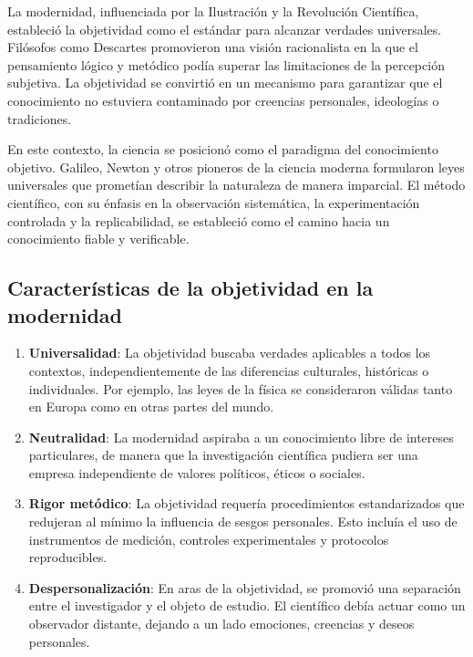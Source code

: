 \documentclass[
  letterpaper,
  DIV=11,
  numbers=noendperiod]{scrreprt}
\begin{document}
La modernidad, influenciada por la Ilustración y la Revolución
Científica, estableció la objetividad como el estándar para alcanzar
verdades universales. Filósofos como Descartes promovieron una visión
racionalista en la que el pensamiento lógico y metódico podía superar
las limitaciones de la percepción subjetiva. La objetividad se convirtió
en un mecanismo para garantizar que el conocimiento no estuviera
contaminado por creencias personales, ideologías o tradiciones.

En este contexto, la ciencia se posicionó como el paradigma del
conocimiento objetivo. Galileo, Newton y otros pioneros de la ciencia
moderna formularon leyes universales que prometían describir la
naturaleza de manera imparcial. El método científico, con su énfasis en
la observación sistemática, la experimentación controlada y la
replicabilidad, se estableció como el camino hacia un conocimiento
fiable y verificable.

\subsection{Características de la objetividad en la
modernidad}\label{caracteruxedsticas-de-la-objetividad-en-la-modernidad}

\begin{enumerate}
\def\labelenumi{\arabic{enumi}.}
\item
  \textbf{Universalidad}: La objetividad buscaba verdades aplicables a
  todos los contextos, independientemente de las diferencias culturales,
  históricas o individuales. Por ejemplo, las leyes de la física se
  consideraron válidas tanto en Europa como en otras partes del mundo.
\item
  \textbf{Neutralidad}: La modernidad aspiraba a un conocimiento libre
  de intereses particulares, de manera que la investigación científica
  pudiera ser una empresa independiente de valores políticos, éticos o
  sociales.
\item
  \textbf{Rigor metódico}: La objetividad requería procedimientos
  estandarizados que redujeran al mínimo la influencia de sesgos
  personales. Esto incluía el uso de instrumentos de medición, controles
  experimentales y protocolos reproducibles.
\item
  \textbf{Despersonalización}: En aras de la objetividad, se promovió
  una separación entre el investigador y el objeto de estudio. El
  científico debía actuar como un observador distante, dejando a un lado
  emociones, creencias y deseos personales.
\end{enumerate}
\end{document}

